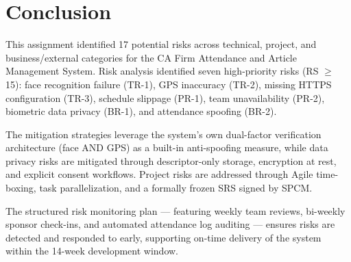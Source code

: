 \documentclass[12pt,a4paper]{article}
\begin{document}
\section{Conclusion}
This assignment identified 17 potential risks across technical, project, and business/external categories for the CA Firm Attendance and Article Management System. Risk analysis identified seven high-priority risks (RS $\geq$ 15): face recognition failure (TR-1), GPS inaccuracy (TR-2), missing HTTPS configuration (TR-3), schedule slippage (PR-1), team unavailability (PR-2), biometric data privacy (BR-1), and attendance spoofing (BR-2).

The mitigation strategies leverage the system's own dual-factor verification architecture (face {\footnotesize AND} GPS) as a built-in anti-spoofing measure, while data privacy risks are mitigated through descriptor-only storage, encryption at rest, and explicit consent workflows. Project risks are addressed through Agile time-boxing, task parallelization, and a formally frozen SRS signed by SPCM.

The structured risk monitoring plan --- featuring weekly team reviews, bi-weekly sponsor check-ins, and automated attendance log auditing --- ensures risks are detected and responded to early, supporting on-time delivery of the system within the 14-week development window.
\end{document}
